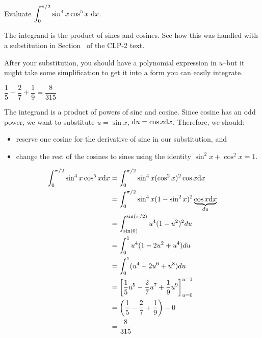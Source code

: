 


\subsection*{\Procedural}

\begin{question} Evaluate
$\displaystyle\int_0^{{\pi}/{2}} \sin^4 x \cos^5 x~ \mathrm{d}x$.
\end{question}

\begin{hint}
The integrand is the product of sines and cosines. See how this was handled with a substitution in Section~ of the CLP-2 text.%

After your substitution, you should have a polynomial expression in $u$--but it might take some simplification to get it into a form you can easily integrate.
\end{hint}

\begin{answer}
$\dfrac{1}{5}-\dfrac{2}{7}+\dfrac{1}{9}
=\dfrac{8}{315}$
\end{answer}

\begin{solution}

The integrand is a product of powers of sine and cosine. Since cosine has an odd power, we want to substitute $u=\sin x$, $\mathrm{d}u=\cos x \mathrm{d}x$. Therefore, we should:
\begin{itemize}
\item reserve one cosine for the derivative of sine in our substitution, and
\item change the rest of the cosines to sines using the identity $\sin^2x+\cos^2x=1$.
\end{itemize}
\begin{align*}
\int_0^{\pi/2}\sin^4x\cos^5x\mathrm{d}x&=
\int_{0}^{\pi/2}\sin^4x(\cos^2x)^2\cos x\mathrm{d}x\\
&=\int_{0}^{\pi/2}\sin^4x(1-\sin^2x)^2\underbrace{\cos x\mathrm{d}x}_{du}\\
&=
\int_{\sin(0)}^{\sin(\pi/2)}u^4(1-u^2)^2du\\
&=
\int_{0}^{1}u^4(1-2u^2+u^4)du\\
&=
\int_{0}^{1}(u^4-2u^6+u^8)du\\
&=\left[
\frac{1}{5}u^5-\frac{2}{7}u^7+\frac{1}{9}u^9
\right]_{u=0}^{u=1}\\
&=
\left(\frac{1}{5}-\frac{2}{7}+\frac{1}{9}\right)
-
0\\
&=\dfrac{8}{315}
\end{align*}
\end{solution}




